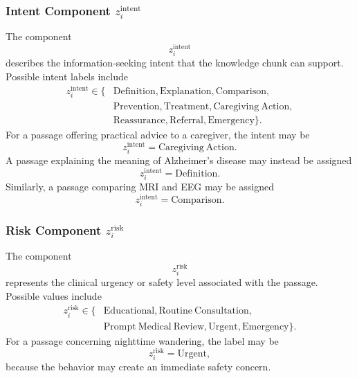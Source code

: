 \documentclass{article}
\begin{document}
\subsubsection{Intent Component $z_i^{\mathrm{intent}}$}
The component
\begin{equation}
    z_i^{\mathrm{intent}}
\end{equation}
describes the information-seeking intent that the knowledge chunk can support.
Possible intent labels include
\begin{equation}
\begin{split}
    z_i^{\mathrm{intent}} \in
    \{&
    \mathrm{Definition},
    \mathrm{Explanation},
    \mathrm{Comparison},\\
    &\mathrm{Prevention},
    \mathrm{Treatment},
    \mathrm{Caregiving\ Action},\\
    &\mathrm{Reassurance},
    \mathrm{Referral},
    \mathrm{Emergency}
    \}.
\end{split}
\end{equation}
For a passage offering practical advice to a caregiver, the intent may be
\begin{equation}
    z_i^{\mathrm{intent}} = \mathrm{Caregiving\ Action}.
\end{equation}
A passage explaining the meaning of Alzheimer's disease may instead be assigned
\begin{equation}
    z_i^{\mathrm{intent}} = \mathrm{Definition}.
\end{equation}
Similarly, a passage comparing MRI and EEG may be assigned
\begin{equation}
    z_i^{\mathrm{intent}} = \mathrm{Comparison}.
\end{equation}

\subsubsection{Risk Component $z_i^{\mathrm{risk}}$}
The component
\begin{equation}
    z_i^{\mathrm{risk}}
\end{equation}
represents the clinical urgency or safety level associated with the passage.
Possible values include
\begin{equation}
\begin{split}
    z_i^{\mathrm{risk}} \in
    \{&
    \mathrm{Educational},
    \mathrm{Routine\ Consultation},\\
    &\mathrm{Prompt\ Medical\ Review},
    \mathrm{Urgent},
    \mathrm{Emergency}
    \}.
\end{split}
\end{equation}
For a passage concerning nighttime wandering, the label may be
\begin{equation}
    z_i^{\mathrm{risk}} = \mathrm{Urgent},
\end{equation}
because the behavior may create an immediate safety concern.
\end{document}
